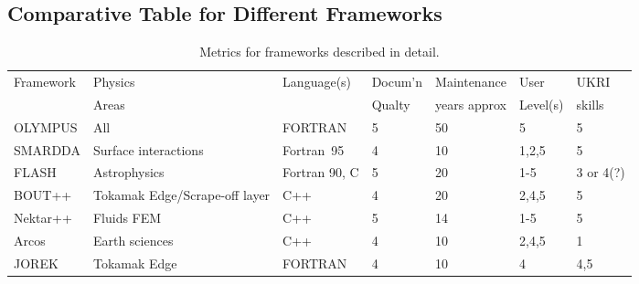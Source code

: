 






\subsection{Comparative Table for Different Frameworks}\label{sec:compare}
\begin{table}[h]\label{tab:assess}
\begin{center}
\caption{Metrics for frameworks described in detail.}
\begin{tabular}{|p{2.0cm}|p{4.0cm}|p{2.2cm}|p{1.6cm}|p{2.4cm}|p{1.6cm}|p{1.6cm}|}
\hline
Framework & Physics & Language(s) & Docum'n & Maintenance & User     &  UKRI \\
          & Areas   &             & Qualty  & years approx    & Level(s) &  skills  \\
\hline
OLYMPUS & All & FORTRAN & 5 & 50 & 5 & 5  \\
SMARDDA & Surface interactions & Fortran~95 & 4 & 10 & 1,2,5 & 5  \\
FLASH & Astrophysics & Fortran 90, C & 5 & 20 & 1-5 & 3 or 4(?) \\
BOUT++ & Tokamak Edge/Scrape-off layer & C++ & 4 & 20 & 2,4,5 & 5 \\
Nektar++ & Fluids FEM & C++ & 5 & 14 & 1-5 & 5\\
Arcos & Earth sciences & C++ & 4 & 10 & 2,4,5 & 1 \\
JOREK & Tokamak Edge & FORTRAN & 4 & 10 & 4 & 4,5 \\
\hline
\hline
\hline
\end{tabular}
\end{center}
\end{table}

